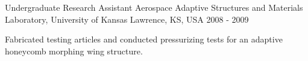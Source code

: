 \begin{cventries}
  \cventry
    {Undergraduate Research Assistant} %
    {Aerospace Adaptive Structures and Materials Laboratory, University of Kansas} %
    {Lawrence, KS, USA} %
    {2008 - 2009} %
    {
      \begin{cvitems} %
        \item {Fabricated testing articles and conducted pressurizing tests for an adaptive honeycomb morphing wing structure.}
      \end{cvitems}
    }


\end{cventries}
